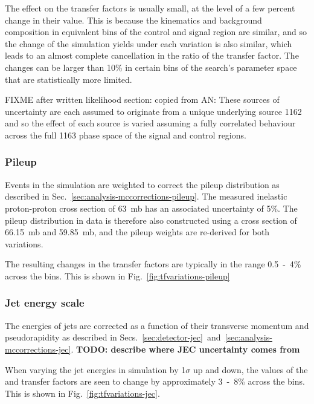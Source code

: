 The effect on the transfer factors is usually small, at the level of a few 
percent change in their value. This is because the kinematics and background 
composition in equivalent bins of the control and signal region are similar, 
and so the change of the simulation yields under each variation is also 
similar, which leads to an almost complete cancellation in the ratio of the 
transfer factor. The changes can be larger than 10\% in certain bins of the 
search's parameter space that are statistically more limited.

FIXME after written likelihood section: copied from AN: These sources of 
uncertainty are each assumed to 
originate from a unique underlying source
1162 and so the effect of each source is varied assuming a fully correlated 
behaviour across the full
1163 phase space of the signal and control regions.


\subsubsection{Pileup}
Events in the simulation are weighted to correct the pileup distribution as 
described in Sec.~\ref{sec:analysis-mccorrections-pileup}. The measured 
inelastic proton-proton cross section of 63~mb has an associated uncertainty of 
5\%. The pileup distribution in data is therefore also constructed using a 
cross section of 66.15~mb and 59.85~mb, and the pileup weights are re-derived 
for both variations.

The resulting changes in the transfer factors are typically in the range 
0.5~-~4\% across the \njnbht bins. This is shown in 
Fig.~\ref{fig:tfvariations-pileup}

\subsubsection{Jet energy scale}
The energies of jets are corrected as a function of their transverse momentum 
and pseudorapidity as described in 
Secs.~\ref{sec:detector-jec}~and~\ref{sec:analysis-mccorrections-jec}. 
\textbf{TODO: describe where JEC uncertainty comes from}

When varying the jet energies in simulation by 1$\sigma$ up and down, the 
values of the \Tmutottw and \Tmumutoz transfer factors are seen to change by 
approximately 3~-~8\% across the \njnbht bins.
This is shown in Fig.~\ref{fig:tfvariations-jec}.

